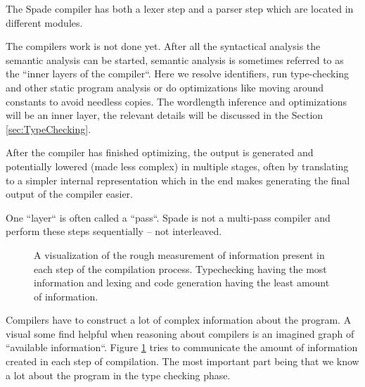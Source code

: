 \documentclass[msc,lith,english]{liuthesis}
\begin{document}
The Spade compiler has both a lexer step and a parser step which are located in different modules.

The compilers work is not done yet. After all the syntactical analysis the semantic analysis can be started, semantic analysis is sometimes referred to as the ``inner layers of the compiler``. Here we resolve identifiers, run type-checking and other static program analysis or do optimizations like moving around constants to avoid needless copies. The wordlength inference and optimizations will be an inner layer, the relevant details will be discussed in the Section \ref{sec:TypeChecking}. 

After the compiler has finished optimizing, the output is generated and potentially lowered (made less complex) in multiple stages, often by translating to a simpler internal representation which in the end makes generating the final output of the compiler easier.

One ``layer`` is often called a ``pass``. Spade is not a multi-pass compiler and perform these steps sequentially -- not interleaved.
\cite{src:DragonBook}\cite{src:CraftingInterp}\cite{src:KKLectures}

\begin{figure}
\begin{center}
  \caption{A visualization of the rough measurement of information present in each step of the compilation process. Typechecking having the most information and lexing and code generation having the least amount of information.}
  \label{fig:InformationCompilation}
\end{center}
\end{figure}

Compilers have to construct a lot of complex information about the program. A visual some find helpful when reasoning about compilers is an imagined graph of ``available information``. Figure \ref{fig:InformationCompilation} tries to communicate the amount of information created in each step of compilation. The most important part being that we know a lot about the program in the type checking phase.
\end{document}
